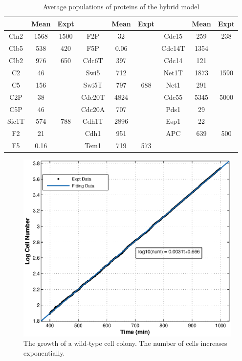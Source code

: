 \documentclass[12pt]{article}
\begin{document}
\begin{table}[H]
  \centering
  \caption{Average populations of proteins of the hybrid model}
  \vspace{0.2in}
  \begin{tabular}{|c|cc|c|cc|c|cc|}
  \hline
        & Mean & Expt &      & Mean & Expt &      & Mean & Expt \\
  \hline
  \hline
   Cln2 &    1568 & 1500    &     F2P &      32 &         &    Cdc15 &     259 &  238 \\
   Clb5 &     538 &  420    &     F5P &    0.06 &         &   Cdc14T &    1354 &      \\
   Clb2 &     976 &  650    &   Cdc6T &     397 &         &   Cdc14  &     121 &      \\
     C2 &      46 &         &    Swi5 &     712 &         &   Net1T  &    1873 & 1590 \\
     C5 &     156 &         &   Swi5T &     797 &  688    &    Net1  &     291 &      \\
    C2P &      38 &         &  Cdc20T &    4824 &         &    Cdc55 &    5345 & 5000 \\
    C5P &      46 &         &  Cdc20A &     707 &         &     Pds1 &      29 &      \\
  Sic1T &     574 &  788    &   Cdh1T &    2896 &         &     Esp1 &      22 &      \\
     F2 &      21 &         &   Cdh1  &     951 &         &      APC &     639 &  500 \\
     F5 &    0.16 &         &    Tem1 &     719 &  573    &          &         &      \\
  \hline
  \end{tabular}

  \label{tab:average}
\end{table}

\begin{figure}[H]
  \centering
  \includegraphics[scale=.8]{./figure/num_wt_fit.eps}
  \caption{The growth of a wild-type cell colony. The number of cells increases exponentially.}
  \label{fig:wt_fit}
\end{figure}
\end{document}
